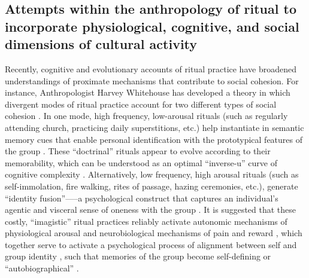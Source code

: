 \begin{CJK}{UTF8}{gbsn}


\subsection{Attempts within the anthropology of ritual to incorporate physiological, cognitive, and social dimensions of cultural activity\label{sect:cogEvAnth}}

Recently, cognitive and evolutionary accounts of ritual practice have  broadened understandings of proximate mechanisms that contribute to social cohesion.  For instance, Anthropologist Harvey Whitehouse has developed a theory in which divergent modes of ritual practice account for two different types of social cohesion \citep[commonly known as the ``modes theory''][]{Whitehouse1996,Whitehouse2004,Whitehouse2014}.  In one mode, high frequency, low-arousal rituals (such as regularly attending church, practicing daily superstitions, etc.) help instantiate in semantic memory cues that enable personal identification with the prototypical features of the group \cite[i.e., ``group identification,'' cf.][]{Turner1987}. These ``doctrinal'' rituals appear to evolve according to their memorability, which can be understood as an optimal ``inverse-u'' curve of cognitive complexity \citep[][]{Whitehouse2005,Kapitany2015}.  Alternatively, low frequency, high arousal rituals (such as self-immolation, fire walking, rites of passage, hazing ceremonies, etc.), generate ``identity fusion''—--a psychological construct that captures an individual’s agentic and visceral sense of oneness with the group \citep{Swann2009,Swann2015}.  It is suggested that these costly, ``imagistic'' ritual practices reliably activate autonomic mechanisms of physiological arousal \citep{Swann2010,Jackson2018} and neurobiological mechanisms of pain and reward \citep{Fischer2014a}, which together serve to activate a psychological process of alignment between self and group identity \citep{Xygalatas2013}, such that memories of the group become self-defining or ``autobiographical'' \citep[see][]{Whitehouse2014}.


\end{CJK}
